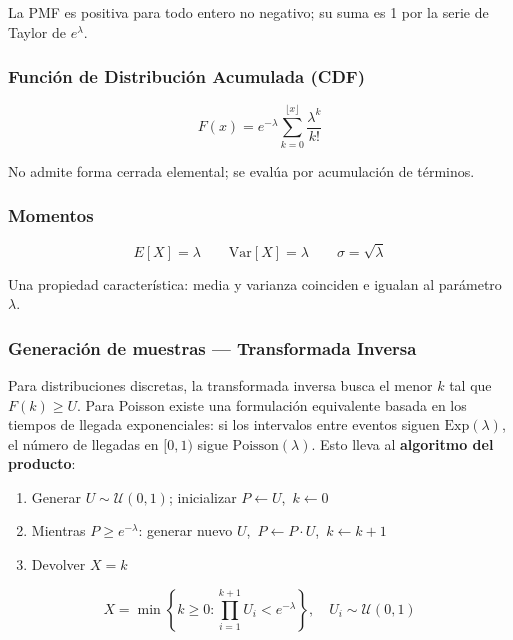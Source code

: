 La PMF es positiva para todo entero no negativo; su suma es 1 por la serie de Taylor de $e^{\lambda}$.

\subsubsection{Función de Distribución Acumulada (CDF)}

\begin{equation}
F(x) = e^{-\lambda} \sum_{k=0}^{\lfloor x \rfloor} \frac{\lambda^k}{k!}
\end{equation}

No admite forma cerrada elemental; se evalúa por acumulación de términos.

\subsubsection{Momentos}

\begin{equation}
E[X] = \lambda \qquad \text{Var}[X] = \lambda \qquad \sigma = \sqrt{\lambda}
\end{equation}

Una propiedad característica: media y varianza coinciden e igualan al parámetro $\lambda$.

\subsubsection{Generación de muestras — Transformada Inversa}

Para distribuciones discretas, la transformada inversa busca el menor $k$ tal que $F(k) \geq U$.
Para Poisson existe una formulación equivalente basada en los tiempos de llegada exponenciales:
si los intervalos entre eventos siguen $\text{Exp}(\lambda)$, el número de llegadas en $[0,1)$
sigue $\text{Poisson}(\lambda)$. Esto lleva al \textbf{algoritmo del producto}:

\begin{enumerate}
    \item Generar $U \sim \mathcal{U}(0,1)$; inicializar $P \leftarrow U$,\ $k \leftarrow 0$
    \item Mientras $P \geq e^{-\lambda}$: generar nuevo $U$,\ $P \leftarrow P \cdot U$,\ $k \leftarrow k + 1$
    \item Devolver $X = k$
\end{enumerate}

\begin{equation}
\boxed{X = \min\!\left\{k \geq 0 : \prod_{i=1}^{k+1} U_i < e^{-\lambda}\right\},
\quad U_i \sim \mathcal{U}(0,1)}
\end{equation}

